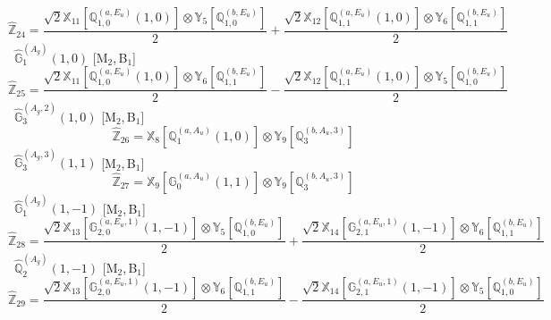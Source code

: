\documentclass[fleqn,10pt,landscape]{article}
\begin{document}
\begin{itemize}
\begin{dmath*}
\hat{\mathbb{Z}}_{24}=\frac{\sqrt{2} \mathbb{X}_{11}[\mathbb{Q}_{1,0}^{(a,E_{u})}(1,0)] \otimes\mathbb{Y}_{5}[\mathbb{Q}_{1,0}^{(b,E_{u})}]}{2} + \frac{\sqrt{2} \mathbb{X}_{12}[\mathbb{Q}_{1,1}^{(a,E_{u})}(1,0)] \otimes\mathbb{Y}_{6}[\mathbb{Q}_{1,1}^{(b,E_{u})}]}{2}
\end{dmath*}
\vspace{4mm}
\noindent {} $\,\,\,\hat{\mathbb{G}}_{1}^{(A_{g})}(1,0)$ [M$_{2}$,\,B$_{1}$]
\begin{dmath*}
\hat{\mathbb{Z}}_{25}=\frac{\sqrt{2} \mathbb{X}_{11}[\mathbb{Q}_{1,0}^{(a,E_{u})}(1,0)] \otimes\mathbb{Y}_{6}[\mathbb{Q}_{1,1}^{(b,E_{u})}]}{2} - \frac{\sqrt{2} \mathbb{X}_{12}[\mathbb{Q}_{1,1}^{(a,E_{u})}(1,0)] \otimes\mathbb{Y}_{5}[\mathbb{Q}_{1,0}^{(b,E_{u})}]}{2}
\end{dmath*}
\vspace{4mm}
\noindent {} $\,\,\,\hat{\mathbb{G}}_{3}^{(A_{g},2)}(1,0)$ [M$_{2}$,\,B$_{1}$]
\begin{dmath*}
\hat{\mathbb{Z}}_{26}=\mathbb{X}_{8}[\mathbb{Q}_{1}^{(a,A_{u})}(1,0)] \otimes\mathbb{Y}_{9}[\mathbb{Q}_{3}^{(b,A_{u},3)}]
\end{dmath*}
\vspace{4mm}
\noindent {} $\,\,\,\hat{\mathbb{G}}_{3}^{(A_{g},3)}(1,1)$ [M$_{2}$,\,B$_{1}$]
\begin{dmath*}
\hat{\mathbb{Z}}_{27}=\mathbb{X}_{9}[\mathbb{G}_{0}^{(a,A_{u})}(1,1)] \otimes\mathbb{Y}_{9}[\mathbb{Q}_{3}^{(b,A_{u},3)}]
\end{dmath*}
\vspace{4mm}
\noindent {} $\,\,\,\hat{\mathbb{G}}_{1}^{(A_{g})}(1,-1)$ [M$_{2}$,\,B$_{1}$]
\begin{dmath*}
\hat{\mathbb{Z}}_{28}=\frac{\sqrt{2} \mathbb{X}_{13}[\mathbb{G}_{2,0}^{(a,E_{u},1)}(1,-1)] \otimes\mathbb{Y}_{5}[\mathbb{Q}_{1,0}^{(b,E_{u})}]}{2} + \frac{\sqrt{2} \mathbb{X}_{14}[\mathbb{G}_{2,1}^{(a,E_{u},1)}(1,-1)] \otimes\mathbb{Y}_{6}[\mathbb{Q}_{1,1}^{(b,E_{u})}]}{2}
\end{dmath*}
\vspace{4mm}
\noindent {} $\,\,\,\hat{\mathbb{Q}}_{2}^{(A_{g})}(1,-1)$ [M$_{2}$,\,B$_{1}$]
\begin{dmath*}
\hat{\mathbb{Z}}_{29}=\frac{\sqrt{2} \mathbb{X}_{13}[\mathbb{G}_{2,0}^{(a,E_{u},1)}(1,-1)] \otimes\mathbb{Y}_{6}[\mathbb{Q}_{1,1}^{(b,E_{u})}]}{2} - \frac{\sqrt{2} \mathbb{X}_{14}[\mathbb{G}_{2,1}^{(a,E_{u},1)}(1,-1)] \otimes\mathbb{Y}_{5}[\mathbb{Q}_{1,0}^{(b,E_{u})}]}{2}

\end{dmath*}
\end{itemize}
\end{document}
